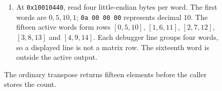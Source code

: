 \begin{figure}[htbp]
\begin{minipage}{\linewidth}
\begin{enumerate}
      \item At \texttt{0x10010440}, read four little-endian bytes per word. The first words are $0,5,10,1$; \texttt{0a 00 00 00} represents decimal 10. The fifteen active words form rows $[0,5,10]$, $[1,6,11]$, $[2,7,12]$, $[3,8,13]$ and $[4,9,14]$. Each debugger line groups four words, so a displayed line is not a matrix row. The sixteenth word is outside the active output.
    \end{enumerate}
  \end{minipage}
  \caption{The ordinary transpose returns fifteen elements before the caller stores the count.}
  \label{capture:011-matrix-transpose-f01-ordinary}
  \label{transpose-f01-ordinary}
\end{figure}
\par
